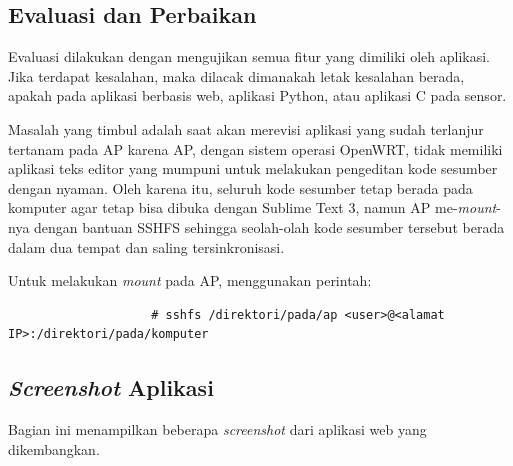 		\subsection{Evaluasi dan Perbaikan}
			Evaluasi dilakukan dengan mengujikan semua fitur yang dimiliki oleh aplikasi. Jika terdapat kesalahan, maka dilacak dimanakah letak kesalahan berada, apakah pada aplikasi berbasis web, aplikasi Python, atau aplikasi C pada sensor.

			Masalah yang timbul adalah saat akan merevisi aplikasi yang sudah terlanjur tertanam pada AP karena AP, dengan sistem operasi OpenWRT, tidak memiliki aplikasi teks editor yang mumpuni untuk melakukan pengeditan kode sesumber dengan nyaman. Oleh karena itu, seluruh kode sesumber tetap berada pada komputer agar tetap bisa dibuka dengan Sublime Text 3, namun AP me-\emph{mount}-nya dengan bantuan SSHFS sehingga seolah-olah kode sesumber tersebut berada dalam dua tempat dan saling tersinkronisasi.

			Untuk melakukan \emph{mount} pada AP, menggunakan perintah:
			\begingroup
			    \fontsize{10pt}{12pt}\selectfont
			    \begin{verbatim}
			    	# sshfs /direktori/pada/ap <user>@<alamat IP>:/direktori/pada/komputer
			    \end{verbatim}  
			\endgroup
			

		\subsection{\emph{Screenshot} Aplikasi}
			Bagian ini menampilkan beberapa \emph{screenshot} dari aplikasi web yang dikembangkan.

